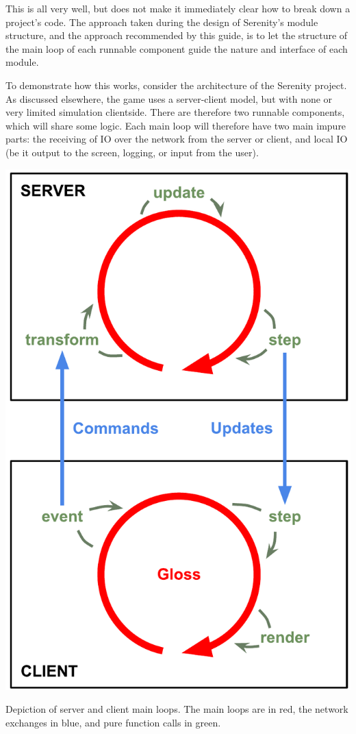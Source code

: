 This is all very well, but does not make it immediately clear how to break down a project's code. The approach taken during the design of Serenity's module structure, and the approach recommended by this guide, is to let the structure of the main loop of each runnable component guide the nature and interface of each module.

To demonstrate how this works, consider the architecture of the Serenity project. As discussed elsewhere, the game uses a server-client model, but with none or very limited simulation clientside. There are therefore two runnable components, which will share some logic. Each main loop will therefore have two main impure parts: the receiving of IO over the network from the server or client, and local IO (be it output to the screen, logging, or input from the user).

\begin{marginfigure}
	\includegraphics{res/architecture.pdf}
	\caption[Depiction of server and client main loops.]{Depiction of server and client main loops. The main loops are in red, the network exchanges in blue, and pure function calls in green.}
	\label{fig:loops}
\end{marginfigure}


